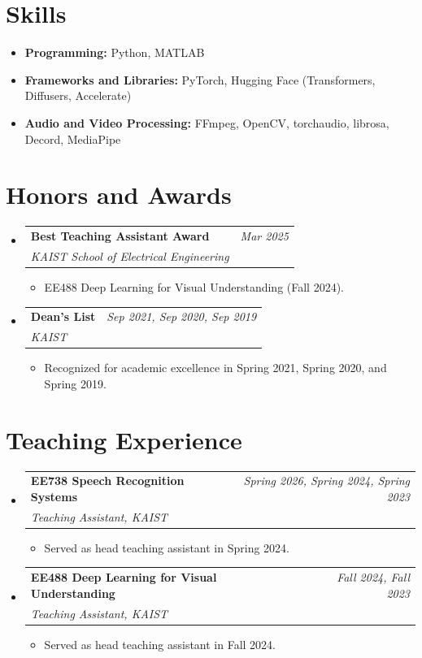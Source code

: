 \documentclass[a4paper,11pt]{article}
\makeatletter
\newcommand{\resumeItem}[2]{
  \item{
    \textbf{#1}{\hspace{0.5mm}#2 \vspace{-0.5mm}}
  }
}
\newcommand{\resumeSubheading}[4]{
\vspace{0.5mm}\item
    \begin{tabular*}{0.98\textwidth}[t]{l@{\extracolsep{\fill}}r}
        \textbf{#1} & \textit{\footnotesize{#4}} \\
        \textit{\footnotesize{#3}} &  \footnotesize{#2}\\
    \end{tabular*}
    \vspace{-2.4mm}
}
\newcommand{\resumeProject}[4]{
\vspace{0.5mm}\item
    \begin{tabular*}{0.98\textwidth}[t]{l@{\extracolsep{\fill}}r}
        \textbf{#1} & \textit{\footnotesize{#3}} \\
        \footnotesize{\textit{#2}} & \footnotesize{#4}
    \end{tabular*}
    \vspace{-2.4mm}
}
\newcommand{\resumeSubItem}[2]{\resumeItem{#1}{#2}\vspace{-4pt}}
\newcommand{\resumeSubHeadingListStart}{\begin{itemize}[leftmargin=*,labelsep=1mm]}
\newcommand{\resumeHeadingSkillStart}{\begin{itemize}[leftmargin=*,itemsep=1.7mm, rightmargin=2ex]}
\newcommand{\resumeItemListStart}{\begin{itemize}[leftmargin=*,labelsep=1mm,itemsep=0.5mm]}
\newcommand{\resumeSubHeadingListEnd}{\end{itemize}\vspace{2mm}}
\newcommand{\resumeHeadingSkillEnd}{\end{itemize}\vspace{-2mm}}
\newcommand{\resumeItemListEnd}{\end{itemize}\vspace{-2mm}}
\makeatother
\begin{document}
\section{\textbf{Skills}}
\vspace{-0.4mm}
 \resumeHeadingSkillStart
    \resumeSubItem{Programming: }
        {Python, MATLAB}
    \resumeSubItem{Frameworks and Libraries: }
        {PyTorch, Hugging Face (Transformers, Diffusers, Accelerate)}
    \resumeSubItem{Audio and Video Processing: }
        {FFmpeg, OpenCV, torchaudio, librosa, Decord, MediaPipe}

 \resumeHeadingSkillEnd

\section{\textbf{Honors and Awards}}
\vspace{-0.4mm}
\resumeSubHeadingListStart

\resumeProject
  {Best Teaching Assistant Award}
  {KAIST School of Electrical Engineering}
  {Mar 2025}
  {}
\vspace{1mm}
\resumeItemListStart
  \item EE488 Deep Learning for Visual Understanding (Fall 2024).
\resumeItemListEnd

\resumeProject
  {Dean's List}
  {KAIST}
  {Sep 2021, Sep 2020, Sep 2019}
  {}
\vspace{1mm}
\resumeItemListStart
  \item Recognized for academic excellence in 
  Spring 2021, Spring 2020, and Spring 2019.
\resumeItemListEnd

\resumeSubHeadingListEnd
\vspace{-6mm}

\section{\textbf{Teaching Experience}}
\vspace{-0.4mm}
  \resumeSubHeadingListStart

  \resumeSubheading
      {EE738 Speech Recognition Systems}{}
      {Teaching Assistant, KAIST}{Spring 2026, Spring 2024, Spring 2023}
      \vspace{1mm}
      \resumeItemListStart
        \item Served as head teaching assistant in Spring 2024.
      \resumeItemListEnd 

  \resumeSubheading
      {EE488 Deep Learning for Visual Understanding}{}
      {Teaching Assistant, KAIST}{Fall 2024, Fall 2023}
      \vspace{1mm}
      \resumeItemListStart
        \item Served as head teaching assistant in Fall 2024.
      \resumeItemListEnd 
  \resumeSubHeadingListEnd
\vspace{-6mm}
\end{document}
